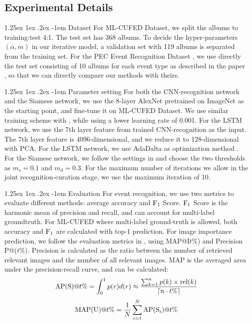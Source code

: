 \documentclass[runningheads]{llncs}
\makeatletter
\renewcommand\paragraph{\@startsection{paragraph}{4}{\z@}%
           {1.25ex \@plus1ex \@minus.2ex}%
           {-1em}%
           {\normalfont\normalsize\bfseries}}
\makeatother
\begin{document}
\subsection{Experimental Details}
\paragraph{Dataset} For ML-CUFED Dataset, we split the albums to training:test 4:1. The test set has 368 albums. To decide the hyper-parameters $(\alpha, m)$ in our iterative model, a validation set with 119 albums is separated from the training set.  For the PEC Event Recognition Dataset \cite{HMM}, we use directly the test set consisting of 10 albums for each event type as described in the paper \cite{HMM}, so that we can directly compare our methods with theirs.

\paragraph{Parameter setting} For both the CNN-recognition network and the Siamese network, we use the 8-layer AlexNet \cite{imagenet} pretrained on ImageNet as the starting point, and fine-tune it on ML-CUFED Dataset. We use similar training scheme with \cite{caffe}, while using a lower learning rate of 0.001. For the LSTM network, we use the 7th layer feature from trained CNN-recognition as the input. The 7th layer feature is 4096-dimensional, and we reduce it to 128-dimensional with PCA. For the LSTM network, we use AdaDalta as optimization method \cite{adadelta} \cite{theano1} \cite{theano2}. For the Siamese network, we follow the settings in \cite{CVPR} and choose the two thresholds as $m_{s} = 0.1$ and $m_{d}=0.3$. For the maximum number of iterations we allow in the joint recognition-curation stage, we use the maximum iteration of 10.

\paragraph{Evaluation} For event recognition, we use two metrics to evaluate different methods: average accuracy and $\textup{F}_{1}$ Score.  $\textup{F}_{1}$ Score is the harmonic mean of precision and recall, and can account for multi-label groundtruth. For ML-CUFED where multi-label ground-truth is allowed, both accuracy and $\textup{F}_{1}$ are calculated with top-1 prediction. For image importance prediction, we follow the evaluation metrics in \cite{CVPR}, using MAP@I$t\%$) and Precision P@($t\%$).  Precision is calculated as the ratio between the number of retrieved relevant images and the number of all relevant images. MAP is the averaged area under the precision-recall curve, and can be calculated:
\begin{equation}
\textup{AP(S)}@t\%=\int_{0}^{1}p(r)d(r)\approx \frac{\sum_{k=1}^{n}p(k)\times \textup{rel}(k)}{\left \lceil n\cdot t\% \right \rceil}
\end{equation}
\begin{equation}
\textup{MAP(U)}@t\% = \frac{1}{N}\sum_{i=1}^{N}\textup{AP}(\textup{S}_{i})@t\%
\end{equation}
\end{document}
